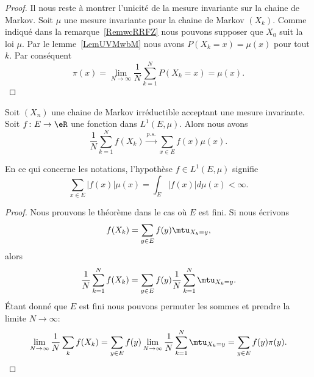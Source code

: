 \begin{proof}
	Il nous reste à montrer l'unicité de la mesure invariante sur la chaine de Markov. Soit \( \mu\) une mesure invariante pour la chaine de Markov \( (X_k)\). Comme indiqué dans la remarque~\ref{RemwcRRFZ} nous pouvons supposer que \( X_0\) suit la loi \( \mu\). Par le lemme~\ref{LemUVMwbM} nous avons \( P(X_k=x)=\mu(x)\) pour tout \( k\). Par conséquent
	\begin{equation}
		\pi(x)=\lim_{N\to \infty} \frac{1}{ N }\sum_{k=1}^NP(X_k=x)=\mu(x).
	\end{equation}
\end{proof}

\begin{theorem}
	Soit \( (X_n)\) une chaine de Markov irréductible acceptant une mesure invariante. Soit \( f\colon E\to \eR\) une fonction dans \( L^1(E,\mu)\). Alors nous avons
	\begin{equation}
		\frac{1}{ N }\sum_{k=1}^Nf(X_k)\stackrel{p.s.}{\longrightarrow}\sum_{x\in E}f(x)\mu(x).
	\end{equation}
\end{theorem}
En ce qui concerne les notations, l'hypothèse \( f\in L^1(E,\mu)\) signifie
\begin{equation}
	\sum_{x\in E}| f(x) |\mu(x)=\int_E| f(x) |d\mu(x)<\infty.
\end{equation}

\begin{proof}
	Nous prouvons le théorème dans le cas où \( E\) est fini. Si nous écrivons
	\begin{equation}
		f(X_k)=\sum_{y\in E}f(y)\mtu_{X_k=y},
	\end{equation}
	alors
	\begin{equation}
		\frac{1}{ N }\sum_{k=1}^Nf(X_k)=\sum_{y\in E}f(y)\frac{1}{ N }\sum_{k=1}^N\mtu_{X_k=y}.
	\end{equation}
	Étant donné que \( E\) est fini nous pouvons permuter les sommes et prendre la limite \( N\to\infty\):
	\begin{equation}
		\lim_{N\to \infty} \frac{1}{ N }\sum_kf(X_k)=\sum_{y\in E}f(y)\lim_{N\to \infty} \frac{1}{ N }\sum_{k=1}^N\mtu_{X_k=y}=\sum_{y\in E}f(y)\pi(y).
	\end{equation}
\end{proof}


